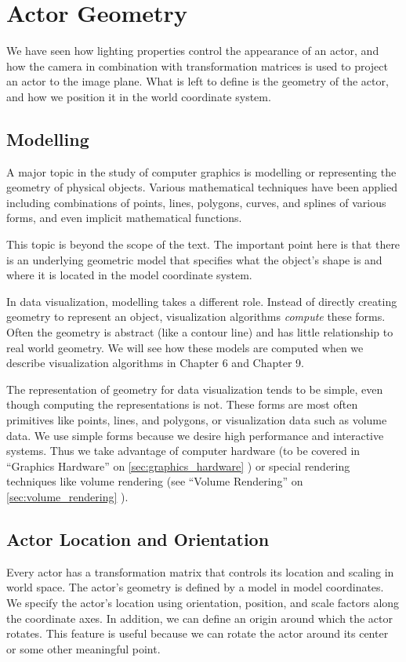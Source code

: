 \section{Actor Geometry}
We have seen how lighting properties control the appearance of an actor, and how the camera in combination with transformation matrices is used to project an actor to the image plane. What is left to define is the geometry of the actor, and how we position it in the world coordinate system.

\subsection{Modelling}
A major topic in the study of computer graphics is modelling or representing the geometry of physical objects. Various mathematical techniques have been applied including combinations of points, lines, polygons, curves, and splines of various forms, and even implicit mathematical functions.

This topic is beyond the scope of the text. The important point here is that there is an underlying geometric model that specifies what the object's shape is and where it is located in the model coordinate system.

In data visualization, modelling takes a different role. Instead of directly creating geometry to represent an object, visualization algorithms \emph{compute} these forms. Often the geometry is abstract (like a contour line) and has little relationship to real world geometry. We will see how these models are computed when we describe visualization algorithms in Chapter 6 and Chapter 9.

The representation of geometry for data visualization tends to be simple, even though computing the representations is not. These forms are most often primitives like points, lines, and polygons, or visualization data such as volume data. We use simple forms because we desire high performance and interactive systems. Thus we take advantage of computer hardware (to be covered in ``Graphics Hardware'' on \ref{sec:graphics_hardware} ) or special rendering techniques like volume rendering (see ``Volume Rendering'' on \ref{sec:volume_rendering} ).

\subsection{Actor Location and Orientation}

Every actor has a transformation matrix that controls its location and scaling in world space. The actor's geometry is defined by a model in model coordinates. We specify the actor's location using orientation, position, and scale factors along the coordinate axes. In addition, we can define an origin around which the actor rotates. This feature is useful because we can rotate the actor around its center or some other meaningful point.

